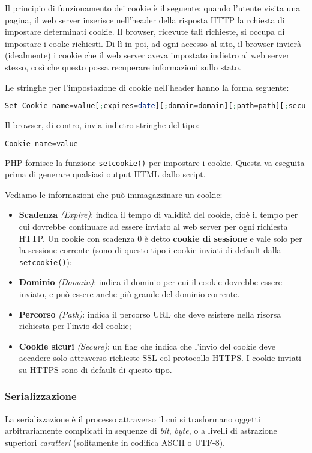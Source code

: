 \documentclass[a4paper,11pt]{article}
\begin{document}
Il principio di funzionamento dei cookie è il seguente: quando l'utente visita una pagina, il web server inserisce nell'header della risposta HTTP la rchiesta di impostare determinati cookie.
Il browser, ricevute tali richieste, si occupa di impostare i cooke richiesti.
Di lì in poi, ad ogni accesso al sito, il browser invierà (idealmente) i cookie che il web server aveva impostato indietro al web server stesso, così che questo possa recuperare informazioni sullo stato.

Le stringhe per l'impostazione di cookie nell'header hanno la forma seguente: 
\begin{lstlisting}[language=php, style=codestyle]	
Set-Cookie name=value[;expires=date][;domain=domain][;path=path][;secure]
\end{lstlisting}

Il browser, di contro, invia indietro stringhe del tipo:
\begin{lstlisting}[language=php, style=codestyle]	
Cookie name=value
\end{lstlisting}

PHP fornisce la funzione \lstinline|setcookie()| per impostare i cookie.
Questa va eseguita prima di generare qualsiasi output HTML dallo script.

Vediamo le informazioni che può immagazzinare un cookie:
\begin{itemize}
	\item \textbf{Scadenza} \textit{(Expire)}: indica il tempo di validità del cookie, cioè il tempo per cui dovrebbe continuare ad essere inviato al web server per ogni richiesta HTTP.
		Un cookie con scadenza 0 è detto \textbf{cookie di sessione} e vale solo per la sessione corrente (sono di questo tipo i cookie inviati di default dalla \lstinline|setcookie()|);
	\item \textbf{Dominio} \textit{(Domain)}: indica il dominio per cui il cookie dovrebbe essere inviato, e può essere anche più grande del dominio corrente.
	\item \textbf{Percorso} \textit{(Path)}: indica il percorso URL che deve esistere nella risorsa richiesta per l'invio del cookie;
	\item \textbf{Cookie sicuri} \textit{(Secure)}: un flag che indica che l'invio del cookie deve accadere solo attraverso richieste SSL col protocollo HTTPS. I cookie inviati su HTTPS sono di default di questo tipo.

\end{itemize}

\subsubsection{Serializzazione}
La serializzazione è il processo attraverso il cui si trasformano oggetti arbitrariamente complicati in sequenze di \textit{bit}, \textit{byte}, o a livelli di astrazione superiori \textit{caratteri} (solitamente in codifica ASCII o UTF-8).
\end{document}
